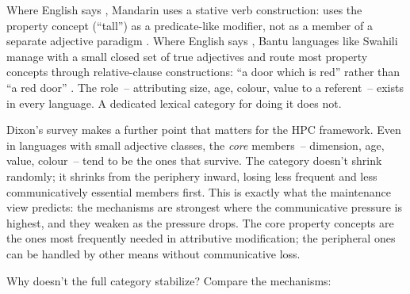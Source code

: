 Where English says , Mandarin uses a stative verb construction:  uses the property concept  (\enquote{tall}) as a predicate-like modifier, not as a member of a separate adjective paradigm \citep{lithompson1981}. Where English says , Bantu languages like Swahili manage with a small closed set of true adjectives and route most property concepts through relative-clause constructions: \enquote{a door which is red} rather than \enquote{a red door} \citep[e.g.,][]{schadeberg1992}. The  role~-- attributing size, age, colour, value to a referent~-- exists in every language. A dedicated lexical category for doing it does not.

Dixon's survey makes a further point that matters for the HPC framework. Even in languages with small adjective classes, the \emph{core} members~-- dimension, age, value, colour~-- tend to be the ones that survive. The category doesn't shrink randomly; it shrinks from the periphery inward, losing less frequent and less communicatively essential members first. This is exactly what the maintenance view predicts: the mechanisms are strongest where the communicative pressure is highest, and they weaken as the pressure drops. The core property concepts are the ones most frequently needed in attributive modification; the peripheral ones can be handled by other means without communicative loss.

Why doesn't the full category stabilize? Compare the mechanisms:

